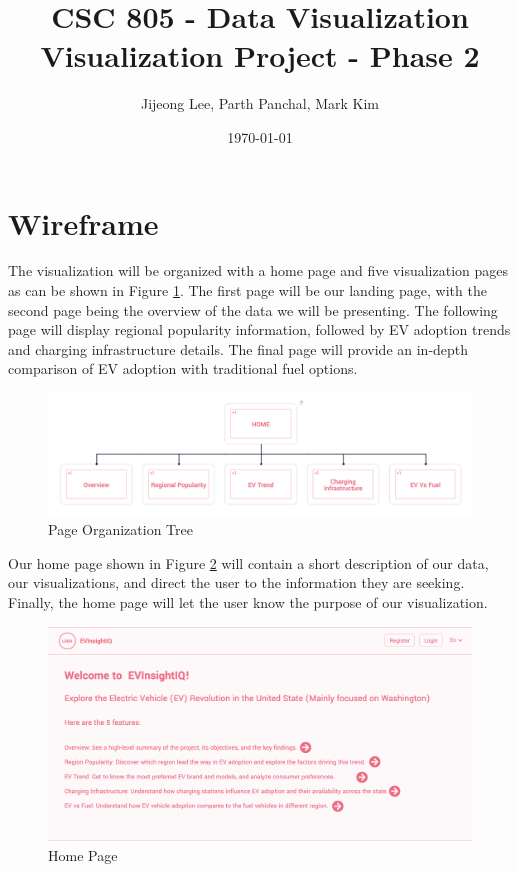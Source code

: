 \documentclass{article}
\title{CSC 805 - Data Visualization\\\large Visualization Project - Phase 2}
\author{Jijeong Lee, Parth Panchal, Mark Kim}
\date{\today}
\begin{document}
\maketitle


\section*{Wireframe}

The visualization will be organized with a home page and five visualization
pages as can be shown in Figure \ref{fig:tree}.  The first page will be our
landing page, with the second page being the overview of the data we will be
presenting. The following page will display regional popularity information, followed by EV adoption trends and charging infrastructure details. The final page will provide an in-depth comparison of EV adoption with traditional fuel options.

\begin{figure}[h]
    \centering
    \includegraphics[scale=0.4]{Tree.png}
    \caption{Page Organization Tree}
    \label{fig:tree}
\end{figure}

Our home page shown in Figure \ref{fig:home} will contain a short
description of our data, our visualizations, and direct the user to the
information they are seeking.  Finally, the home page will let the user know the
purpose of our visualization.
\begin{figure}[h]
    \centering
    \includegraphics[scale=0.25]{Home}
    \caption{Home Page}
    \label{fig:home}
\end{figure}
\end{document}
